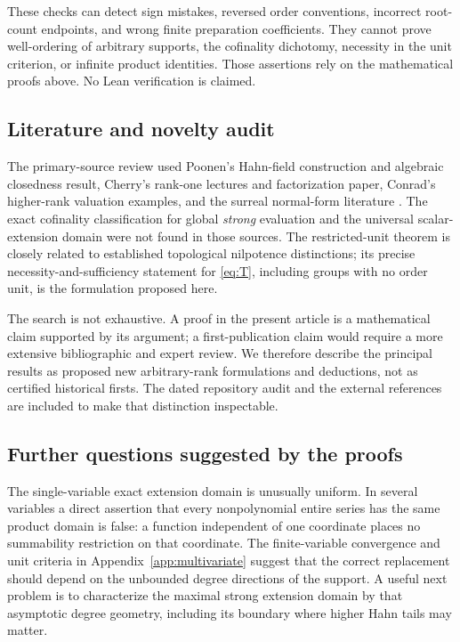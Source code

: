 \documentclass[11pt,letterpaper]{article}
\numberwithin{equation}{section}
\theoremstyle{definition}
\theoremstyle{remark}
\begin{document}
These checks can detect sign mistakes, reversed order conventions, incorrect
root-count endpoints, and wrong finite preparation coefficients. They cannot
prove well-ordering of arbitrary supports, the cofinality dichotomy, necessity
in the unit criterion, or infinite product identities. Those assertions rely
on the mathematical proofs above. No Lean verification is claimed.

\subsection{Literature and novelty audit}
The primary-source review used Poonen's Hahn-field construction and algebraic
closedness result, Cherry's rank-one lectures and factorization paper,
Conrad's higher-rank valuation examples, and the surreal normal-form
literature \cite{Poonen,CherryLectures,CherryFactorization,Conrad,BournezGuilmant}.
The exact cofinality classification for global \emph{strong} evaluation and
the universal scalar-extension domain were not found in those sources. The
restricted-unit theorem is closely related to established topological
nilpotence distinctions; its precise necessity-and-sufficiency statement for
\eqref{eq:T}, including groups with no order unit, is the formulation proposed
here.

The search is not exhaustive. A proof in the present article is a mathematical
claim supported by its argument; a first-publication claim would require a
more extensive bibliographic and expert review. We therefore describe the
principal results as proposed new arbitrary-rank formulations and deductions,
not as certified historical firsts. The dated repository audit and the external
references are included to make that distinction inspectable.

\subsection{Further questions suggested by the proofs}
The single-variable exact extension domain is unusually uniform. In several
variables a direct assertion that every nonpolynomial entire series has the
same product domain is false: a function independent of one coordinate places
no summability restriction on that coordinate. The finite-variable convergence
and unit criteria in Appendix~\ref{app:multivariate} suggest that the correct
replacement should depend on the unbounded degree directions of the support.
A useful next problem is to characterize the maximal strong extension domain
by that asymptotic degree geometry, including its boundary where higher Hahn
tails may matter.
\end{document}
